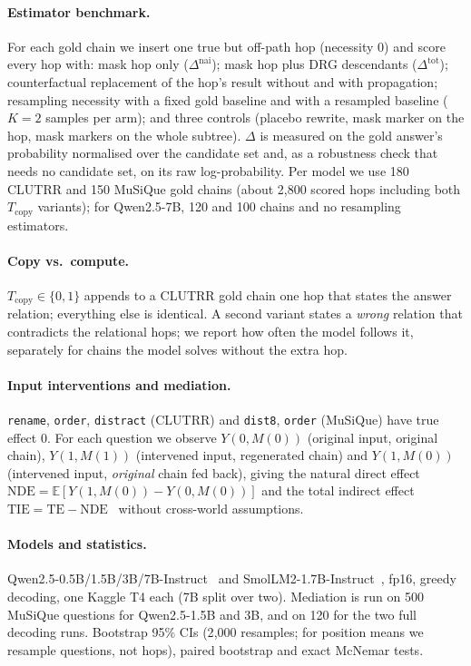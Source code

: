 \documentclass[11pt]{article}
\begin{document}
\paragraph{Estimator benchmark.} For each gold chain we insert one true but off-path hop
(necessity $0$) and score every hop with: mask hop only ($\Delta^{\text{nai}}$); mask hop plus DRG
descendants ($\Delta^{\text{tot}}$); counterfactual replacement of the hop's result without and with
propagation; resampling necessity with a fixed gold baseline and with a resampled baseline
($K=2$ samples per arm); and three controls (placebo rewrite, mask marker on the hop, mask markers
on the whole subtree). $\Delta$ is measured on the gold answer's probability normalised over the
candidate set and, as a robustness check that needs no candidate set, on its raw log-probability.
Per model we use 180 CLUTRR and 150 MuSiQue gold chains (about 2{,}800 scored hops including both
$T_{\text{copy}}$ variants); for Qwen2.5-7B, 120 and 100 chains and no resampling estimators.

\paragraph{Copy vs.\ compute.} $T_{\text{copy}}\in\{0,1\}$ appends to a CLUTRR gold chain one hop
that states the answer relation; everything else is identical. A second variant states a
\emph{wrong} relation that contradicts the relational hops; we report how often the model follows
it, separately for chains the model solves without the extra hop.

\paragraph{Input interventions and mediation.} \texttt{rename}, \texttt{order}, \texttt{distract}
(CLUTRR) and \texttt{dist8}, \texttt{order} (MuSiQue) have true effect $0$. For each question we
observe $Y(0,M(0))$ (original input, original chain), $Y(1,M(1))$ (intervened input, regenerated
chain) and $Y(1,M(0))$ (intervened input, \emph{original} chain fed back), giving the natural
direct effect $\mathrm{NDE}=\mathbb E[Y(1,M(0))-Y(0,M(0))]$ and the total indirect effect
$\mathrm{TIE}=\mathrm{TE}-\mathrm{NDE}$~\citep{pearl2001direct} without cross-world assumptions.

\paragraph{Models and statistics.} Qwen2.5-0.5B/1.5B/3B/7B-Instruct~\citep{qwen2025qwen25} and
SmolLM2-1.7B-Instruct~\citep{allal2025smollm2}, fp16, greedy decoding, one Kaggle T4 each (7B
split over two). Mediation is run on 500 MuSiQue questions for Qwen2.5-1.5B and 3B, and on 120
for the two full decoding runs. Bootstrap 95\% CIs (2{,}000 resamples; for position means we
resample questions, not hops), paired bootstrap and exact McNemar tests.
\end{document}
